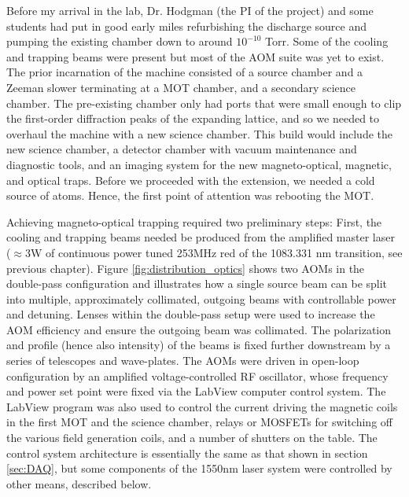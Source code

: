 	Before my arrival in the lab, Dr. Hodgman (the PI of the project) and some students had put in good early miles refurbishing the discharge source and pumping the existing chamber down to around $10^{-10}$ Torr.
	Some of the cooling and trapping beams were present but most of the AOM suite was yet to exist.
	The prior incarnation of the machine consisted of a source chamber and a Zeeman slower terminating at a MOT chamber, and a secondary science chamber.
	The pre-existing chamber only had ports that were small enough to clip the first-order diffraction peaks of the expanding lattice, and so we needed to overhaul the machine 
	with a new science chamber.
	This build would include the new science chamber, a detector chamber with vacuum maintenance and diagnostic tools, and an imaging system for the new magneto-optical, magnetic, and optical traps.
	Before we proceeded with the extension, we needed a cold source of atoms. 
	Hence, the first point of attention was rebooting the MOT.

	Achieving magneto-optical trapping required two preliminary steps: First, the cooling and trapping beams needed be produced from the amplified master laser ($\approx$3W of continuous power tuned 253MHz red of the 1083.331 nm transition, see previous chapter).
	Figure \ref{fig:distribution_optics} shows two AOMs in the double-pass configuration and illustrates how a single source beam can be split into multiple, approximately collimated, outgoing beams with controllable power and detuning.
	Lenses within the double-pass setup were used to increase the AOM efficiency and ensure the outgoing beam was collimated.
	The polarization and profile (hence also intensity) of the beams is fixed further downstream by a series of telescopes and wave-plates.
	The AOMs were driven in open-loop configuration by an amplified voltage-controlled RF oscillator, whose frequency and power set point were fixed via the LabView computer control system.
	The LabView program was also used to control the current driving the magnetic coils in the first MOT and the science chamber, relays or MOSFETs for switching off the various field generation coils, and a number of shutters on the table.
	The control system architecture is essentially the same as that shown in section \ref{sec:DAQ}, but some components of the 1550nm laser system were controlled by other means, described below.
	
